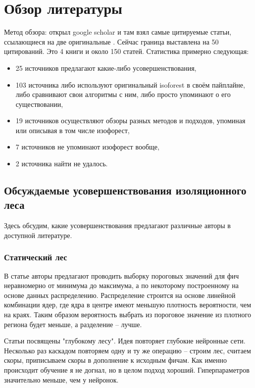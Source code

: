 \documentclass[12pt]{article}
\begin{document}
\section{Обзор литературы}

Метод обзора: открыл google scholar и там взял самые цитируемые статьи,
ссылающиеся на две оригинальные
\cite{liuIsolationForest2008}
\cite{liuIsolationBasedAnomalyDetection2012}
.
Сейчас граница выставлена на 50 цитирований. Это 4 книги и около 150 статей.
Статистика примерно следующая:
\begin{itemize}
    \item 25 источников предлагают какие-либо усовершенствования,
    \item 103 источника либо используют оригинальный isoforest в своём пайплайне, либо сравнивают свои алгоритмы с ним, либо просто упоминают о его существовании,
    \item 19 источников осуществляют обзоры разных методов и подходов, упоминая или описывая в том числе изофорест,
    \item 7 источников не упоминают изофорест вообще,
    \item 2 источника найти не удалось.
\end{itemize}


\subsection*{Обсуждаемые усовершенствования изоляционного леса}

Здесь обсудим, какие усовершенствования предлагают различные авторы в доступной литературе.

\subsubsection*{Статический лес}

В статье
\cite{tokovarovProbabilisticGeneralizationIsolation2022}
авторы предлагают проводить выборку пороговых значений для фич неравномерно от
минимума до максимума, а по некоторому построенному на основе данных распределению.
Распределение строится на основе линейной комбинации ядер, где ядра в центре имеют
меньшую плотность вероятности, чем на краях. Таким образом вероятность выбрать из
пороговое значение из плотного региона будет меньше, а разделение -- лучше.

Статьи
\cite{zhouDeepForestAlternative2017}
\cite{zhouDeepForest2019}
посвящены "глубокому лесу". Идея повторяет глубокие нейронные сети. Несколько раз
каскадом повторяем одну и ту же операцию -- строим лес, считаем скоры, приписываем
скоры в дополнение к исходным фичам. Как именно происходит обучение я не догнал,
но в целом подход хороший. Гиперпараметров значительно меньше, чем у нейронок.
\end{document}
